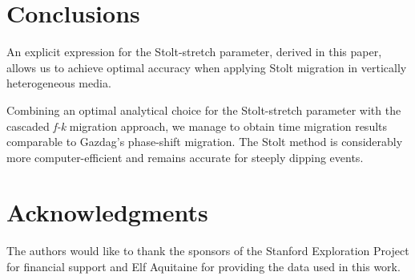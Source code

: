 



\section{Conclusions}

An explicit expression for the Stolt-stretch parameter, derived in this
paper, allows us to achieve optimal accuracy when applying Stolt
migration in vertically heterogeneous media.

Combining an optimal analytical choice for the Stolt-stretch parameter
with the cascaded {\it f-k} migration approach, we manage to obtain
time migration results comparable to Gazdag's phase-shift migration.
The Stolt method is considerably more computer-efficient and remains
accurate for steeply dipping events.

\section{Acknowledgments}

The authors would like to thank the sponsors of the Stanford
Exploration Project for financial support and Elf Aquitaine for
providing the data used in this work.




\append{\ }

